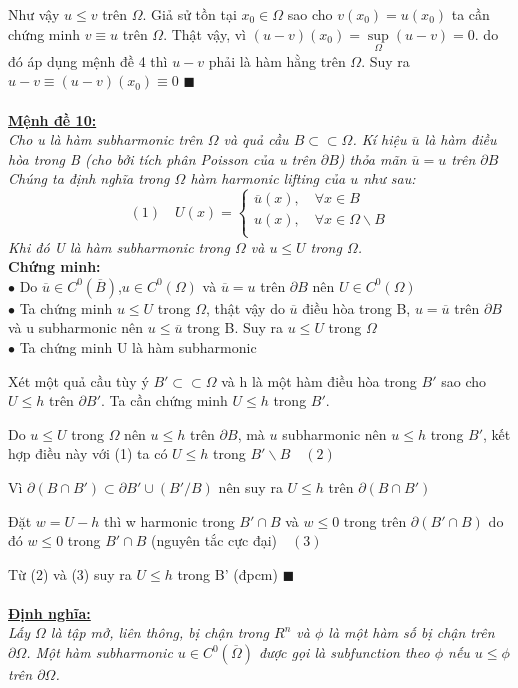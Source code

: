 Như vậy $u\le v$ trên $\Omega$. Giả sử tồn tại $x_0  \in \Omega $ sao cho $v(x_0)=u(x_0)$ ta cần chứng minh $v \equiv u$ trên $\Omega$. Thật vậy, vì $(u-v)(x_0)=\sup\limits_\Omega  (u-v)=0$. do đó áp dụng mệnh đề 4 thì $u-v$ phải  là hàm hằng trên $\Omega$. Suy ra $u-v \equiv (u-v)(x_0) \equiv 0$ $\blacksquare$
\\
\\
{ \bf\underline{Mệnh đề 10:}}
\\
{\it Cho u là hàm subharmonic trên $\Omega$ và quả cầu $B \subset  \subset \Omega$. Kí hiệu $\overline u $ là hàm điều hòa trong B (cho bởi tích phân Poisson của u trên $\partial B$) thỏa mãn $\overline u=u$ trên $\partial B$\\
Chúng ta định nghĩa trong $\Omega$ hàm harmonic lifting của $u$ như sau:
\[
(1)\quad U(x) = \left\{ \begin{array}{l}
 \overline u (x),\quad\forall x \in B \\ 
 u(x),\quad\forall x \in \Omega \backslash B \\ 
 \end{array} \right.
\]
Khi đó U là hàm subharmonic trong $\Omega$ và $u\le U$ trong $\Omega$.}\\
{\bf {Chứng minh:}}\\
$ \bullet$ Do $\overline u  \in C^0 (\overline B )$,$u \in C^0(\Omega) $ và $\overline u  = u$  trên $\partial B$ nên $U\in C^0(\Omega)$
\\
$ \bullet$ Ta chứng minh $u\le U$ trong $\Omega$, thật vậy do $\overline u$ điều hòa trong B, $u=\overline u$ trên $\partial B$ và u subharmonic nên $u\le \overline u$ trong B. Suy ra  $u\le U$ trong $\Omega$
\\
$ \bullet$ Ta chứng minh U là hàm subharmonic

Xét một quả cầu tùy ý  $B' \subset  \subset \Omega$ và h là một hàm điều hòa trong $B'$ sao cho $U\le h$ trên $\partial B'$. Ta cần chứng minh $U\le h$ trong $B'$.

Do $u\le U$ trong $\Omega$ nên $u\le h$ trên $\partial B$, mà $u$ subharmonic nên $u\le h$ trong $B'$, kết hợp điều này với (1) ta có $U\le h$ trong  $B'\backslash B\quad(2)$

Vì $\partial (B \cap B') \subset \partial B' \cup (B'/B)$ nên suy ra $U\le h$ trên $\partial(B\cap B')$

Đặt $ w=U-h$ thì w harmonic trong $B'\cap B$ và $w\le 0$ trong trên $\partial (B'\cap B)$ do đó $w\le 0$ trong $B'\cap B$ (nguyên tắc cực đại)$\quad(3)$

Từ (2) và (3) suy ra $U\le h$ trong B' (đpcm) $\blacksquare$
\\
\\
{\bf \underline{Định nghĩa:}} 
\\
{\it Lấy $\Omega$ là tập mở, liên thông, bị chận trong $R^n$ và $\phi$ là một hàm số bị chận trên $\partial \Omega$. Một hàm  subharmonic $u\in C^0(\overline \Omega)  $ được gọi là subfunction theo $\phi$ nếu $u\le \phi$ trên $\partial \Omega$.}
\\

